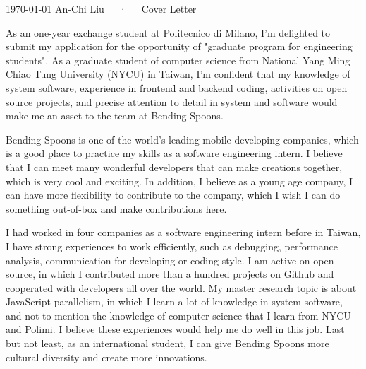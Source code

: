 \documentclass[11pt, a4paper]{awesome-cv}
\begin{document}
\makecvheader[R]

\makecvfooter
  {\today}
  {An-Chi Liu~~~·~~~Cover Letter}
  {}

\makelettertitle

\begin{cvletter}

As an one-year exchange student at Politecnico di Milano, I’m delighted to submit my
application for the opportunity of "graduate program for engineering students".
As a graduate student of computer science from National Yang Ming Chiao Tung University (NYCU) in Taiwan,
I’m confident that my knowledge of system software, experience in frontend and backend coding, activities on open source projects,
and precise attention to detail in system and software would make me an asset to the team at Bending Spoons.


Bending Spoons is one of the world's leading mobile developing companies, which is a good place to
practice my skills as a software engineering intern. I believe that I can meet many wonderful
developers that can make creations together, which is very cool and exciting.
In addition, I believe as a young age company, I can have more flexibility to contribute to the company,
which I wish I can do something out-of-box and make contributions here.

I had worked in four companies as a software engineering intern before in Taiwan, I have strong experiences
to work efficiently, such as debugging, performance analysis, communication for developing or coding style.
I am active on open source, in which I contributed more than a hundred projects on Github and cooperated with
developers all over the world.
My master research topic is about JavaScript parallelism,
in which I learn a lot of knowledge in system software, and not to mention the knowledge of
computer science that I learn from NYCU and Polimi. I believe these experiences would help me do well in this job.
Last but not least, as an international student, I can give Bending Spoons more cultural diversity and create
more innovations.

\end{cvletter}


\makeletterclosing
\end{document}
